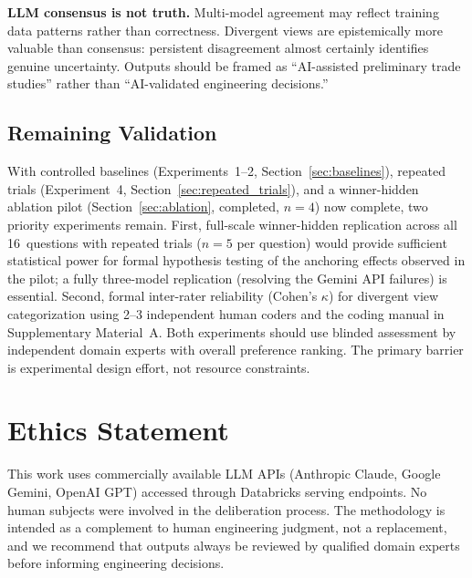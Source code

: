 \documentclass[11pt,a4paper]{article}
\begin{document}
\textbf{LLM consensus is not truth.} Multi-model agreement may reflect training data patterns rather than correctness. Divergent views are epistemically more valuable than consensus: persistent disagreement almost certainly identifies genuine uncertainty. Outputs should be framed as ``AI-assisted preliminary trade studies'' rather than ``AI-validated engineering decisions.''

\subsection{Remaining Validation}
\label{sec:validation_roadmap}

With controlled baselines (Experiments~1--2, Section~\ref{sec:baselines}), repeated trials (Experiment~4, Section~\ref{sec:repeated_trials}), and a winner-hidden ablation pilot (Section~\ref{sec:ablation}, completed, $n=4$) now complete, two priority experiments remain. First, full-scale winner-hidden replication across all 16~questions with repeated trials ($n=5$ per question) would provide sufficient statistical power for formal hypothesis testing of the anchoring effects observed in the pilot; a fully three-model replication (resolving the Gemini API failures) is essential. Second, formal inter-rater reliability (Cohen's $\kappa$) for divergent view categorization using 2--3 independent human coders and the coding manual in Supplementary Material~A. Both experiments should use blinded assessment by independent domain experts with overall preference ranking. The primary barrier is experimental design effort, not resource constraints.

\section{Ethics Statement}
\label{sec:ethics}

This work uses commercially available LLM APIs (Anthropic Claude, Google Gemini, OpenAI GPT) accessed through Databricks serving endpoints. No human subjects were involved in the deliberation process. The methodology is intended as a complement to human engineering judgment, not a replacement, and we recommend that outputs always be reviewed by qualified domain experts before informing engineering decisions.
\end{document}
